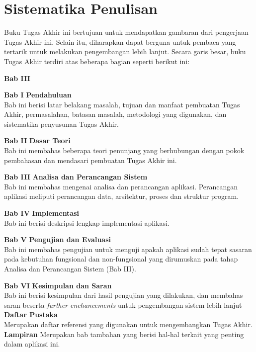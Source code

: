    \section{Sistematika Penulisan}	
	    Buku Tugas Akhir ini bertujuan untuk mendapatkan gambaran dari pengerjaan Tugas Akhir ini. Selain itu, diharapkan dapat berguna untuk pembaca yang tertarik untuk melakukan pengembangan lebih lanjut. Secara garis besar, buku Tugas Akhir terdiri atas beberapa bagian seperti berikut ini:
	    \begin{labeling}{\textbf{Bab III}}
	    	\item[\textbf{Bab I}] 
		    	\textbf{Pendahuluan}\\
				Bab ini berisi latar belakang masalah, tujuan dan manfaat pembuatan Tugas Akhir, permasalahan, batasan masalah, metodologi yang digunakan, dan sistematika penyusunan Tugas Akhir. 
	    	\item[\textbf{Bab II}] \textbf{Dasar Teori} \\
		    	Bab ini membahas beberapa teori penunjang yang berhubungan dengan pokok pembahasan dan mendasari pembuatan Tugas Akhir ini. 
	    	\item[\textbf{Bab III}] \textbf{Analisa dan Perancangan Sistem} \\ 
		    	Bab ini membahas mengenai analisa dan perancangan aplikasi. Perancangan aplikasi meliputi perancangan data, arsitektur, proses dan struktur program.
	    	\item[\textbf{Bab IV}] \textbf{Implementasi} \\
		    	Bab ini berisi deskripsi lengkap implementasi aplikasi.		    	
	    	\item[\textbf{Bab V}] \textbf{Pengujian dan Evaluasi} \\
		    	Bab ini membahas pengujian untuk menguji apakah aplikasi sudah tepat sasaran pada kebutuhan fungsional dan non-fungsional yang dirumuskan pada tahap Analisa dan Perancangan Sistem (Bab III).
	    	\item[\textbf{Bab VI}] 	\textbf{Kesimpulan dan Saran}\\
							    	Bab ini berisi kesimpulan dari hasil pengujian yang dilakukan, dan membahas saran beserta \textit{further enchancements} untuk pengembangan sistem lebih lanjut
								    \textbf{Daftar Pustaka}\\
								    Merupakan daftar referensi yang digunakan untuk mengembangkan Tugas Akhir.
									\textbf{Lampiran}
									Merupakan bab tambahan yang berisi hal-hal terkait yang penting dalam aplikasi ini.
		\end{labeling}